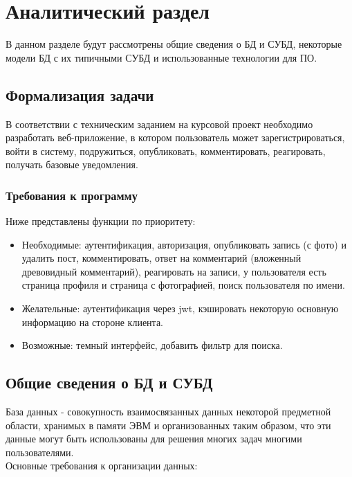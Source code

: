 \chapter{Аналитический раздел}
\label{cha:analysis}

В данном разделе будут рассмотрены общие сведения о БД и СУБД,
некоторые модели БД с их типичными СУБД и использованные технологии для ПО.

\section{Формализация задачи}

В соответствии с техническим заданием на курсовой проект необходимо разработать
веб-приложение, в котором пользователь может зарегистрироваться, войти в систему, подружиться,
опубликовать, комментировать, реагировать, получать базовые уведомления.

\subsection*{Требования к программу}

Ниже представлены функции по приоритету:

\begin{itemize}
  \setlength{\itemsep}{0em}
  \item Необходимые: аутентификация, авторизация, опубликовать запись (с фото) и удалить пост,
  комментировать, ответ на комментарий (вложенный древовидный комментарий),
  реагировать на записи, у пользователя есть страница профиля и страница с фотографией,
  поиск пользователя по имени.
  \item Желательные: аутентификация через jwt, кэшировать некоторую основную информацию на стороне клиента.
  \item Возможные: темный интерфейс, добавить фильтр для поиска.
\end{itemize}


\section{Общие сведения о БД и СУБД}

База данных - совокупность взаимосвязанных данных некоторой предметной области, хранимых в памяти ЭВМ и
организованных таким образом, что эти данные могут быть использованы для решения многих задач многими пользователями.
\\

Основные требования к организации данных:

